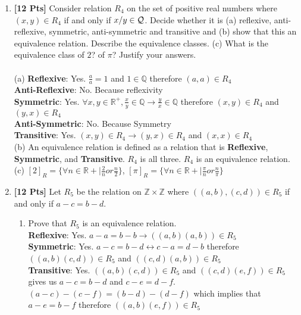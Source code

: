 \documentclass[11pt]{article}
\begin{document}
\begin{enumerate}
\begin{enumerate}
\end{enumerate}

\clearpage

\item {\bf [12 Pts]} Consider relation $R_4$ on the set of positive real numbers where 
$(x,y) \in R_4$ if and only if $x/y \in \cal Q$. Decide whether it is (a) reflexive, anti-reflexive, symmetric, anti-symmetric and transitive and (b) show that this an equivalence relation. Describe the equivalence classes. (c) What is the equivalence class of $2$? of $\pi$? Justify your answers.\\\\
(a) 
\textbf{Reflexive}: Yes. $\frac{a}{a} = 1$ and $1 \in \mathbb{Q}$ therefore $(a,a) \in R_4$\\
\textbf{Anti-Reflexive}: No. Because reflexivity\\
\textbf{Symmetric}: Yes. $\forall x,y \in \mathbb{R^+}, \frac{x}{y} \in \mathbb{Q} \rightarrow \frac{y}{x} \in \mathbb{Q}$ therefore $(x,y) \in R_4$ and $(y,x) \in R_4$\\
\textbf{Anti-Symmetric}: No. Because Symmetry\\
\textbf{Transitive}: Yes. $(x,y) \in R_4 \rightarrow (y,x) \in R_4$ and $(x,x) \in R_4$\\

(b) 
An equivalence relation is defined as a relation that is \textbf{Reflexive}, \textbf{Symmetric}, and \textbf{Transitive}. $R_4$ is all three. $R_4$ is an equivalence relation.\\

(c) 
$[2]_R = \{ \forall n \in \mathbb{R+} | \frac{2}{n} or \frac{n}{2}\}$, $[\pi]_R = \{ \forall n \in \mathbb{R+} | \frac{\pi}{n} or \frac{n}{\pi}\}$\\

\item {\bf [12 Pts]} Let $R_5$ be the relation on $\mathbb{Z} \times \mathbb{Z}$ where 
$((a,b), (c,d)) \in R_5$ if and only if $a-c = b-d$. \\

\begin{enumerate}

\item Prove that $R_5$ is an equivalence relation. \\

\textbf{Reflexive}: Yes. $a - a = b - b \rightarrow ((a,b)(a,b)) \in R_5$\\
\textbf{Symmetric}: Yes. $a - c = b - d \leftrightarrow c - a = d - b$ therefore $((a,b)(c,d)) \in R_5$ and $((c,d)(a,b)) \in R_5$\\
\textbf{Transitive}: Yes. $((a,b)(c,d)) \in R_5$ and $((c,d)(e,f)) \in R_5$ gives us $a - c = b - d$ and $c - e = d - f$. $(a-c) - (c - f) = (b - d) - (d - f)$ which implies that $a-e = b - f$ therefore $((a,b)(e,f)) \in R_5$\\


\end{enumerate}
\end{enumerate}
\end{document}
